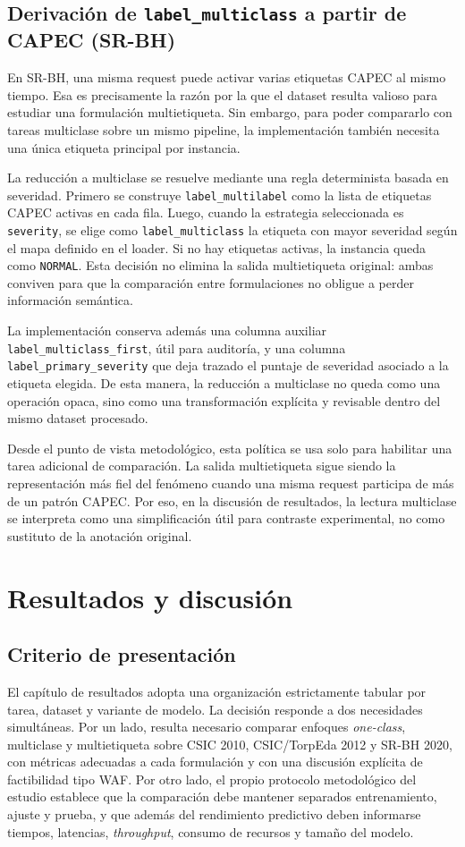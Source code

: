 \documentclass[12pt,oneside]{report}
\begin{document}

\section{Derivación de \texttt{label\_multiclass} a partir de CAPEC (SR-BH)}
En SR-BH, una misma request puede activar varias etiquetas CAPEC al mismo tiempo. Esa es precisamente la razón por la que el dataset resulta valioso para estudiar una formulación multietiqueta. Sin embargo, para poder compararlo con tareas multiclase sobre un mismo pipeline, la implementación también necesita una única etiqueta principal por instancia.

La reducción a multiclase se resuelve mediante una regla determinista basada en severidad. Primero se construye \texttt{label\_multilabel} como la lista de etiquetas CAPEC activas en cada fila. Luego, cuando la estrategia seleccionada es \texttt{severity}, se elige como \texttt{label\_multiclass} la etiqueta con mayor severidad según el mapa definido en el loader. Si no hay etiquetas activas, la instancia queda como \texttt{NORMAL}. Esta decisión no elimina la salida multietiqueta original: ambas conviven para que la comparación entre formulaciones no obligue a perder información semántica.

La implementación conserva además una columna auxiliar \texttt{label\_multiclass\_first}, útil para auditoría, y una columna \texttt{label\_primary\_severity} que deja trazado el puntaje de severidad asociado a la etiqueta elegida. De esta manera, la reducción a multiclase no queda como una operación opaca, sino como una transformación explícita y revisable dentro del mismo dataset procesado.

Desde el punto de vista metodológico, esta política se usa solo para habilitar una tarea adicional de comparación. La salida multietiqueta sigue siendo la representación más fiel del fenómeno cuando una misma request participa de más de un patrón CAPEC. Por eso, en la discusión de resultados, la lectura multiclase se interpreta como una simplificación útil para contraste experimental, no como sustituto de la anotación original.


\chapter{Resultados y discusión}

\section{Criterio de presentación}
El capítulo de resultados adopta una organización estrictamente tabular por tarea, dataset y variante de modelo. La decisión responde a dos necesidades simultáneas. Por un lado, resulta necesario comparar enfoques \textit{one-class}, multiclase y multietiqueta sobre CSIC 2010, CSIC/TorpEda 2012 y SR-BH 2020, con métricas adecuadas a cada formulación y con una discusión explícita de factibilidad tipo WAF. Por otro lado, el propio protocolo metodológico del estudio establece que la comparación debe mantener separados entrenamiento, ajuste y prueba, y que además del rendimiento predictivo deben informarse tiempos, latencias, \textit{throughput}, consumo de recursos y tamaño del modelo.\
\end{document}
